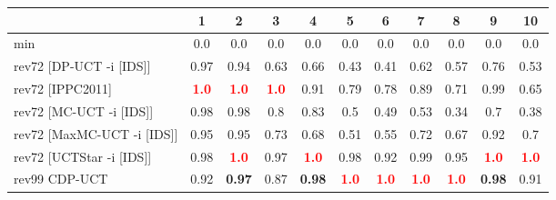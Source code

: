 \documentclass{article}
\begin{document}
\begin{tabular}{|l|r@{$\pm$}rr@{$\pm$}rr@{$\pm$}rr@{$\pm$}rr@{$\pm$}rr@{$\pm$}rr@{$\pm$}rr@{$\pm$}rr@{$\pm$}rr@{$\pm$}r|}
\hline

& \multicolumn{2}{c}{1}
& \multicolumn{2}{c}{2}
& \multicolumn{2}{c}{3}
& \multicolumn{2}{c}{4}
& \multicolumn{2}{c}{5}
& \multicolumn{2}{c}{6}
& \multicolumn{2}{c}{7}
& \multicolumn{2}{c}{8}
& \multicolumn{2}{c}{9}
& \multicolumn{2}{c|}{10}
\\
\hline
\hline
min
& \multicolumn{2}{c}{0.0}
& \multicolumn{2}{c}{0.0}
& \multicolumn{2}{c}{0.0}
& \multicolumn{2}{c}{0.0}
& \multicolumn{2}{c}{0.0}
& \multicolumn{2}{c}{0.0}
& \multicolumn{2}{c}{0.0}
& \multicolumn{2}{c}{0.0}
& \multicolumn{2}{c}{0.0}
& \multicolumn{2}{c|}{0.0}
\\
rev72 [DP-UCT -i [IDS]]
& \multicolumn{2}{c}{0.97}
& \multicolumn{2}{c}{0.94}
& \multicolumn{2}{c}{0.63}
& \multicolumn{2}{c}{0.66}
& \multicolumn{2}{c}{0.43}
& \multicolumn{2}{c}{0.41}
& \multicolumn{2}{c}{0.62}
& \multicolumn{2}{c}{0.57}
& \multicolumn{2}{c}{0.76}
& \multicolumn{2}{c|}{0.53}
\\
rev72 [IPPC2011]
& \multicolumn{2}{c}{\textbf{\textcolor{red}{1.0}}}
& \multicolumn{2}{c}{\textbf{\textcolor{red}{1.0}}}
& \multicolumn{2}{c}{\textbf{\textcolor{red}{1.0}}}
& \multicolumn{2}{c}{0.91}
& \multicolumn{2}{c}{0.79}
& \multicolumn{2}{c}{0.78}
& \multicolumn{2}{c}{0.89}
& \multicolumn{2}{c}{0.71}
& \multicolumn{2}{c}{0.99}
& \multicolumn{2}{c|}{0.65}
\\
rev72 [MC-UCT -i [IDS]]
& \multicolumn{2}{c}{0.98}
& \multicolumn{2}{c}{0.98}
& \multicolumn{2}{c}{0.8}
& \multicolumn{2}{c}{0.83}
& \multicolumn{2}{c}{0.5}
& \multicolumn{2}{c}{0.49}
& \multicolumn{2}{c}{0.53}
& \multicolumn{2}{c}{0.34}
& \multicolumn{2}{c}{0.7}
& \multicolumn{2}{c|}{0.38}
\\
rev72 [MaxMC-UCT -i [IDS]]
& \multicolumn{2}{c}{0.95}
& \multicolumn{2}{c}{0.95}
& \multicolumn{2}{c}{0.73}
& \multicolumn{2}{c}{0.68}
& \multicolumn{2}{c}{0.51}
& \multicolumn{2}{c}{0.55}
& \multicolumn{2}{c}{0.72}
& \multicolumn{2}{c}{0.67}
& \multicolumn{2}{c}{0.92}
& \multicolumn{2}{c|}{0.7}
\\
rev72 [UCTStar -i [IDS]]
& \multicolumn{2}{c}{0.98}
& \multicolumn{2}{c}{\textbf{\textcolor{red}{1.0}}}
& \multicolumn{2}{c}{0.97}
& \multicolumn{2}{c}{\textbf{\textcolor{red}{1.0}}}
& \multicolumn{2}{c}{0.98}
& \multicolumn{2}{c}{0.92}
& \multicolumn{2}{c}{0.99}
& \multicolumn{2}{c}{0.95}
& \multicolumn{2}{c}{\textbf{\textcolor{red}{1.0}}}
& \multicolumn{2}{c|}{\textbf{\textcolor{red}{1.0}}}
\\
\hline
rev99 CDP-UCT
& \multicolumn{2}{c}{0.92}
& \multicolumn{2}{c}{\textbf{0.97}}
& \multicolumn{2}{c}{0.87}
& \multicolumn{2}{c}{\textbf{0.98}}
& \multicolumn{2}{c}{\textbf{\textcolor{red}{1.0}}}
& \multicolumn{2}{c}{\textbf{\textcolor{red}{1.0}}}
& \multicolumn{2}{c}{\textbf{\textcolor{red}{1.0}}}
& \multicolumn{2}{c}{\textbf{\textcolor{red}{1.0}}}
& \multicolumn{2}{c}{\textbf{0.98}}
& \multicolumn{2}{c|}{0.91}
\\
\hline
\end{tabular}%
\end{document}
